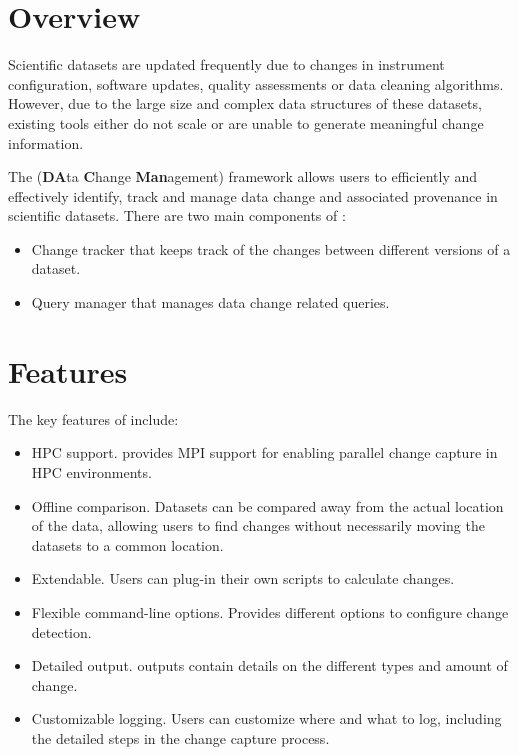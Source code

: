 \section{Overview}
Scientific datasets are updated frequently due to changes in
instrument configuration, software updates, quality assessments
or data cleaning algorithms. However, due to the large size and
complex data structures of these datasets, existing tools either
do not scale or are unable to generate meaningful change information.

The \textbf{\systemname} (\textbf{DA}ta \textbf{C}hange \textbf{Man}agement)
framework allows users to efficiently and effectively identify,
track and manage data change and associated provenance in scientific
datasets. There are two main components of \systemname:
\begin{itemize}
\item Change tracker that keeps track of the changes between
 different versions of a dataset.
\item Query manager that manages data change related queries.
\end{itemize}

\section{Features}
The key features of \systemname include:
\begin{itemize}
\item HPC support. \systemname provides MPI support for enabling parallel
 change capture in HPC environments.
\item Offline comparison. Datasets can be compared away from the actual
 location of the data, allowing users to find changes without necessarily
 moving the datasets to a common location.
\item Extendable. Users can plug-in their own scripts to calculate changes.
\item Flexible command-line options. Provides different options to configure
 change detection.
\item Detailed output. \systemname outputs contain details on the different
 types and amount of change.
\item Customizable logging. Users can customize where and what to log,
 including the detailed steps in the change capture process.
\end{itemize}

